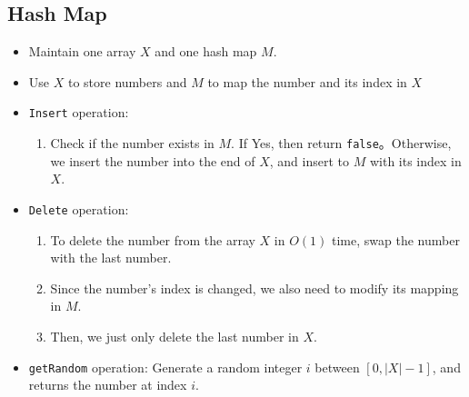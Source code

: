 \subsection{Hash Map}
\begin{itemize}
\item Maintain one array $X$ and one hash map $M$.
\item Use $X$ to store numbers and $M$ to map the number and its index in $X$
\item \texttt{Insert} operation: 
\begin{enumerate}
\item Check if the number exists in $M$. If Yes, then return \texttt{false}。Otherwise, we insert the number into the end of $X$, and insert to $M$ with its index in $X$.
\end{enumerate}
\item \texttt{Delete} operation:
\begin{enumerate}
\item To delete the number from the array $X$ in $O(1)$ time, swap the number with the last number. 
\item Since the number's index is changed, we also need to modify its mapping in $M$.
\item Then, we just only delete the last number in $X$.
\end{enumerate}
\item \texttt{getRandom} operation: Generate a random integer $i$ between $[0, \lvert X\rvert-1]$, and returns the number at index $i$.
\end{itemize}

